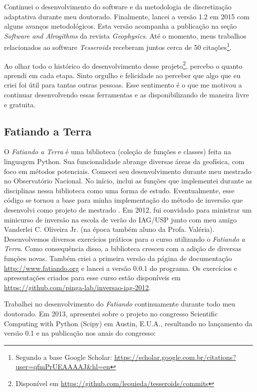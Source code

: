 Continuei o desenvolvimento do software e da metodologia de discretização
adaptativa durante meu doutorado.
Finalmente, lancei a versão 1.2 em 2015 com alguns avanços metodológicos.
Esta versão acompanha a publicação \citet{tesseroids} na seção \textit{Software
and Alrogithms} da revista \textit{Geophysics}.
Até o momento, meus trabalhos relacionados ao software \textit{Tesseroids}
receberam juntos cerca de 50 citações\footnote{Segundo a base Google Scholar:
\url{https://scholar.google.com.br/citations?user=qfmPrUEAAAAJ&hl=en}}.

Ao olhar todo o histórico do desenvolvimento desse
projeto\footnote{Disponível em
\url{https://github.com/leouieda/tesseroids/commits}},
percebo o quanto aprendi em cada etapa.
Sinto orgulho e felicidade ao perceber que algo que eu criei foi útil para
tantas outras pessoas.
Esse sentimento é o que me motivou a continuar desenvolvendo essas ferramentas
e as disponibilizando de maneira livre e gratuita.



\subsection{Fatiando a Terra}


O \textit{Fatiando a Terra} é uma biblioteca (coleção de funções e classes)
feita na linguagem Python.
Sua funcionalidade abrange diversas áreas da geofísica, com foco em métodos
potenciais.
Comecei seu desenvolvimento durante meu mestrado no Observatório Nacional.
No início, inclui as funções que implementei durante as disciplinas nessa
biblioteca como uma forma de estudo.
Eventualmente, esse código se tornou a base para minha implementação do método
de inversão que desenvolvi como projeto de mestrado \citep[][cujo código está
disponível em
\url{https://github.com/pinga-lab/paper-planting-densities}]{seed}.
Em 2012, fui convidado para ministrar um minicurso de inversão na escola de
verão do IAG/USP junto com meu
amigo Vanderlei C. Oliveira Jr. (na época também aluno da Profa.  Valéria).
Desenvolvemos diversos exercícios práticos para o curso utilizando o
\textit{Fatiando a Terra}.
Como consequência disso, a biblioteca cresceu com a adição de diversas funções
novas.
Também criei a primeira versão da página de documentação
\url{http://www.fatiando.org} e lancei a versão 0.0.1 do programa.
Os exercícios e apresentações criados para esse curso estão disponíveis em
\url{https://github.com/pinga-lab/inversao-iag-2012}.

Trabalhei no desenvolvimento do \textit{Fatiando} continuamente durante todo
meu doutorado.
Em 2013, apresentei sobre o projeto no congresso Scientific Computing with
Python (Scipy) em Austin, E.U.A., resultando no lançamento da versão 0.1 e na
publicação nos anais do congresso:


